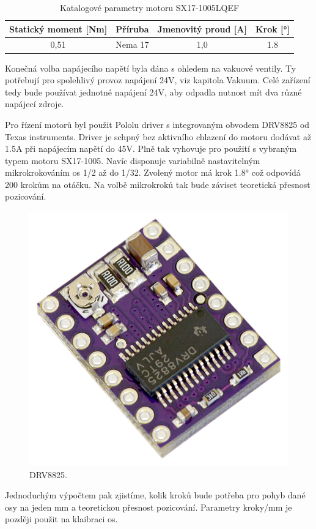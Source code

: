 \begin{table}[h!]
  \caption{Katalogové parametry motoru SX17-1005LQEF }
  \begin{center}
  	\small
	  \begin{tabular}{|c|c|c|c|}
	    \hline
	    Statický moment [Nm]		& Příruba 		& Jmenovitý proud [A]	& Krok [°]	\\
	    \hline\hline

		0,51				& Nema 17		& 1,0			& 1.8		\\

	    \hline
	  \end{tabular}
  \end{center}
\end{table}

Konečná volba napájecího napětí byla dána s ohledem na vakuové ventily. Ty potřebují pro spolehlivý provoz napájení 24V, viz kapitola Vakuum. Celé zařízení tedy bude používat jednotné napájení 24V, aby odpadla nutnost mít dva různé napájecí zdroje.


Pro řízení motorů byl použit Pololu driver s integrovaným obvodem DRV8825 od Texas instruments. Driver je schpný bez aktivního chlazení do motoru dodávat až 1.5A při napájecím napětí do 45V. Plně tak vyhovuje pro použití s vybraným typem motoru SX17-1005. Navíc disponuje variabilně nastavitelným mikrokrokováním os 1/2 až do 1/32. 
Zvolený motor má krok 1.8° což odpovídá 200 krokům na otáčku. Na volbě mikrokroků tak bude záviset teoretická přesnost pozicování.

\begin{figure}[h!]

  \centering
    \includegraphics[width=0.4\linewidth]{obrazky/DRV8825.jpg}%
    \caption{DRV8825.}
\end{figure}

Jednoduchým výpočtem pak zjistíme, kolik kroků bude potřeba pro pohyb dané osy na jeden mm a teoretickou přesnost pozicování. Parametry kroky/mm je později použit na klaibraci os.
 
